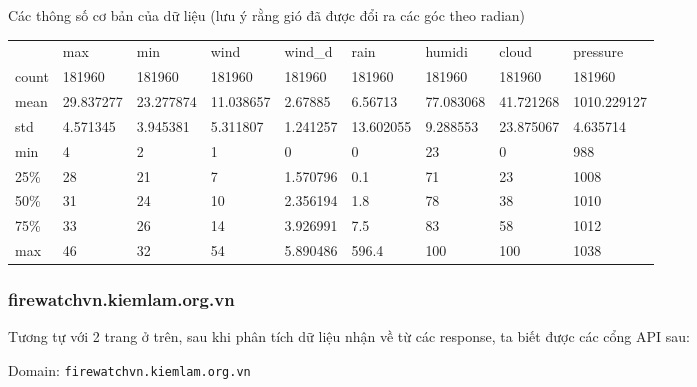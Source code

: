 \documentclass{article}
\begin{document}
Các thông số cơ bản của dữ liệu (lưu ý rằng gió đã được đổi ra các góc theo radian)

\begin{table}[H]
	\begin{tabular}{lllllllll}
		      & max       & min       & wind      & wind\_d  & rain      & humidi    & cloud     & pressure    \\
		count & 181960    & 181960    & 181960    & 181960   & 181960    & 181960    & 181960    & 181960      \\
		mean  & 29.837277 & 23.277874 & 11.038657 & 2.67885  & 6.56713   & 77.083068 & 41.721268 & 1010.229127 \\
		std   & 4.571345  & 3.945381  & 5.311807  & 1.241257 & 13.602055 & 9.288553  & 23.875067 & 4.635714    \\
		min   & 4         & 2         & 1         & 0        & 0         & 23        & 0         & 988         \\
		25\%  & 28        & 21        & 7         & 1.570796 & 0.1       & 71        & 23        & 1008        \\
		50\%  & 31        & 24        & 10        & 2.356194 & 1.8       & 78        & 38        & 1010        \\
		75\%  & 33        & 26        & 14        & 3.926991 & 7.5       & 83        & 58        & 1012        \\
		max   & 46        & 32        & 54        & 5.890486 & 596.4     & 100       & 100       & 1038
	\end{tabular}
\end{table}

\subsubsection{firewatchvn.kiemlam.org.vn}

Tương tự với 2 trang ở trên, sau khi phân tích dữ liệu nhận về từ các response, ta biết được các cổng API sau:

Domain: \texttt{firewatchvn.kiemlam.org.vn}
\end{document}
